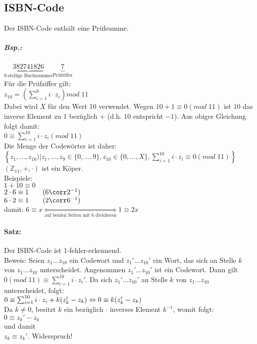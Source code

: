 \documentclass{scrreprt}
\begin{document}
\subsection{ISBN-Code}
Der ISBN-Code enthält eine Prüfsumme.
\subparagraph{Bsp.:} $\underbrace{382741826}_{\text{9-stellige Buchnummer}} \underbrace{7}_{\text{Prüfziffer}}$\\
Für die Prüfziffer gilt:\\
$z_{10}=\left(\sum_{i=1}^9 i\cdot z_i\right) mod\; 11$\\
Dabei wird $X$ für den Wert 10 verwendet. Wegen $10+1\equiv0 (mod\; 11)$ ist $10$ das inverse Element zu $1$ bezüglich $+$ (d.h. $10$ entspricht $-1$). Aus obiger Gleichung folgt damit:\\
$0\equiv \sum_{i=1}^{10} i\cdot z_i(mod\; 11)$\\
Die Menge der Codewörter ist daher: \\
$\left\lbrace z_1,...,z_{10})|z_1,...,z_9\in \{0,...,9\}, z_{10} \in \{0,...,X\},\sum_{i=1}^{10} i\cdot z_i\equiv 0 (mod\; 11)\right\rbrace$\\
$(\mathbb{Z}_{11},+,\cdot)$ ist ein Köper.\\
Beispiele:\\
$1+10\equiv 0$\\
$2\cdot 6 \equiv 1 \qquad (6\corr 2^{-1})$\\
$6\cdot 2 \equiv 1 \qquad (2 \corr 6^{-1})$\\
damit: $6 \equiv x \underset{\text{auf beiden Seiten mit 6 dividieren}}{\Leftrightarrow} 1 \equiv 2x$
\paragraph{Satz:} Der ISBN-Code ist 1-fehler-erkennend.\\
Beweis: Seien $z_1...z_{10}$ ein Codewort und $z_1'...z_{10}'$ ein Wort, das sich an Stelle $k$ von $z_1...z_{10}$ unterscheidet. Angenommen $z_1'...z_{10}'$ ist ein Codewort. Dann gilt $0 (mod\; 11)\equiv \sum_{i=1}^{10} i\cdot z_i'$. Da sich $z_1'...z_{10}'$ an Stelle $k$ von $z_1...z_{10}$ unterscheidet, folgt:\\
$0 \equiv \sum_{i=1}^{10} i\cdot z_i+k(z_k'-z_k) \Leftrightarrow\\
0\equiv k(z_k'-z_k)$\\
Da $k\not = 0$, besitzt $k$ ein bezüglich $\cdot$ inverses Element $k^{-1}$, womit folgt:\\
$0 \equiv z_k'-z_k$\\
und damit\\
$z_k \equiv z_k'$. Widerspruch!
\end{document}
